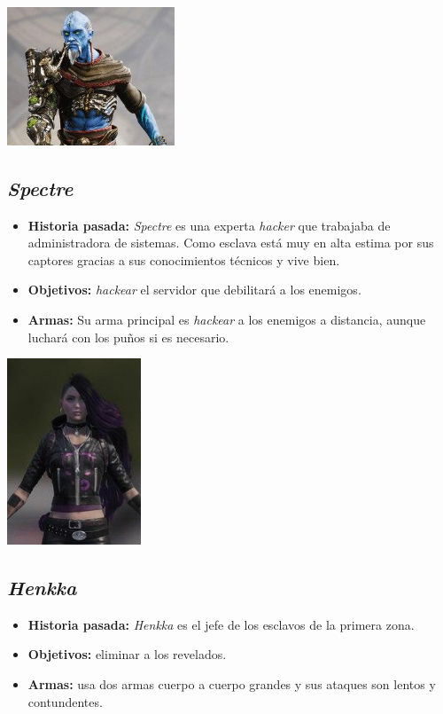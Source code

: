 \documentclass[11pt, twoside]{article}
\begin{document}
\pagestyle{notsection}

\begin{center}
\includegraphics[width=5cm]{./images/serj.jpg}
\end{center}

\subsection{\textit{Spectre}}
\begin{itemize}
\item \textbf{Historia pasada:} \textit{Spectre} es una experta \textit{hacker} que trabajaba de administradora de sistemas. Como esclava está muy en alta estima por sus captores gracias a sus conocimientos técnicos y vive bien. 
\item \textbf{Objetivos:} \textit{hackear} el servidor que debilitará a los enemigos.
\item \textbf{Armas:} Su arma principal es \textit{hackear} a los enemigos a distancia, aunque luchará con los puños si es necesario.
\end{itemize}

\begin{center}
\includegraphics[width=4cm]{./images/spectre.jpg}
\end{center}

\newpage
\subsection{\textit{Henkka}}
\begin{itemize}
\item \textbf{Historia pasada:} \textit{Henkka} es el jefe de los esclavos de la primera zona.
\item \textbf{Objetivos:} eliminar a los revelados.
\item \textbf{Armas:} usa dos armas cuerpo a cuerpo grandes y sus ataques son lentos y contundentes. 
\end{itemize}
\end{document}
